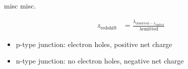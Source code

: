 \documentclass[avery5388, frame, grid]{flashcards}
\begin{document}
\begin{flashcard}{misc misc.}
  {
    \begin{align*}
      z_{\textrm{redshift}} &= \frac{\lambda_{\textrm{observed} - \lambda_{\textrm{emitted}}}}{\lambda{\textrm{emitted}}}
    \end{align*}
    
    \begin{itemize}
    \item p-type junction: electron holes, positive net charge
    \item n-type junction: no electron holes, negative net charge
    \end{itemize}
  }
\end{flashcard}
\end{document}

